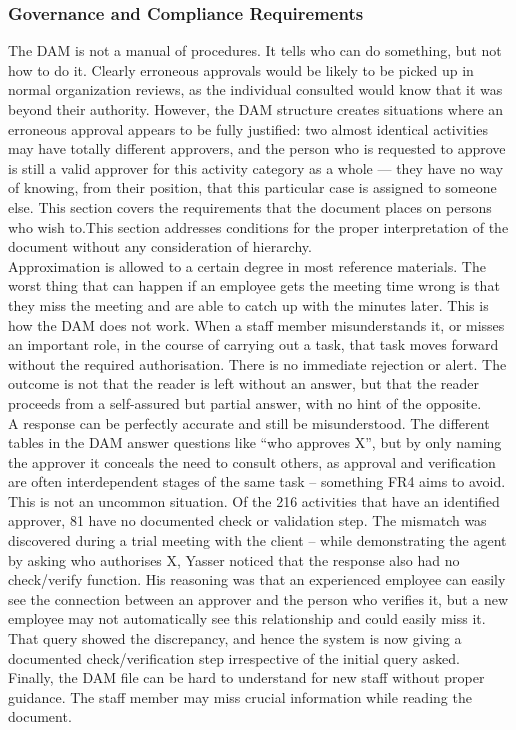 \subsubsection{Governance and Compliance Requirements}

The DAM is not a manual of procedures. It tells who can do something, but not how to do it. Clearly erroneous approvals would be likely to be picked up in normal organization reviews, as the individual consulted would know that it was beyond their authority. However, the DAM structure creates situations where an erroneous approval appears to be fully justified: two almost identical activities may have totally different approvers, and the person who is requested to approve is still a valid approver for this activity category as a whole — they have no way of knowing, from their position, that this particular case is assigned to someone else. This section covers the requirements that the document places on persons who wish to.This section addresses conditions for the proper interpretation of the document without any consideration of hierarchy.\\[0.3cm]
Approximation is allowed to a certain degree in most reference materials. The worst thing that can happen if an employee gets the meeting time wrong is that they miss the meeting and are able to catch up with the minutes later. This is how the DAM does not work. When a staff member misunderstands it, or misses an important role, in the course of carrying out a task, that task moves forward without the required authorisation. There is no immediate rejection or alert. The outcome is not that the reader is left without an answer, but that the reader proceeds from a self-assured but partial answer, with no hint of the opposite.\\[0.3cm]
A response can be perfectly accurate and still be misunderstood. The different tables in the DAM answer questions like “who approves X”, but by only naming the approver it conceals the need to consult others, as approval and verification are often interdependent stages of the same task – something FR4 aims to avoid. This is not an uncommon situation. Of the 216 activities that have an identified approver, 81 have no documented check or validation step. The mismatch was discovered during a trial meeting with the client – while demonstrating the agent by asking who authorises X, Yasser noticed that the response also had no check/verify function. His reasoning was that an experienced employee can easily see the connection between an approver and the person who verifies it, but a new employee may not automatically see this relationship and could easily miss it. That query showed the discrepancy, and hence the system is now giving a documented check/verification step irrespective of the initial query asked.\\[0.3cm]
Finally, the DAM file can be hard to understand for new staff without proper guidance. The staff member may miss crucial information while reading the document.
